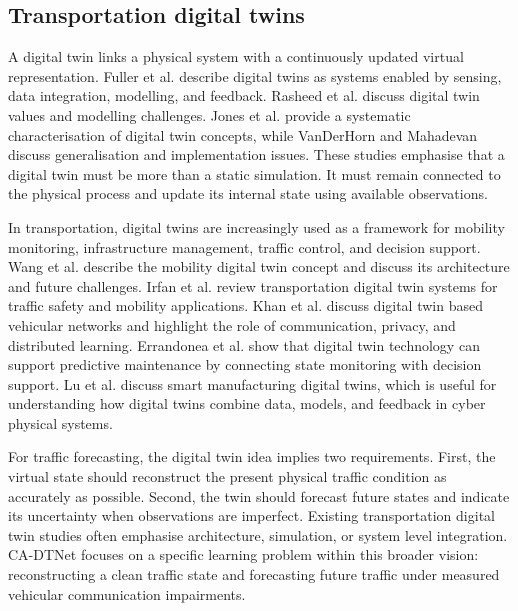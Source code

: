 \documentclass[pdflatex,sn-mathphys-num]{sn-jnl}%
\theoremstyle{thmstyleone}%
\theoremstyle{thmstyletwo}%
\theoremstyle{thmstylethree}%
\begin{document}
\subsection{Transportation digital twins}

A digital twin links a physical system with a continuously updated virtual representation. Fuller et al. \cite{fuller2020digitaltwin} describe digital twins as systems enabled by sensing, data integration, modelling, and feedback. Rasheed et al. \cite{rasheed2020digitaltwin} discuss digital twin values and modelling challenges. Jones et al. \cite{jones2020characterising} provide a systematic characterisation of digital twin concepts, while VanDerHorn and Mahadevan \cite{vanderhorn2021digitaltwin} discuss generalisation and implementation issues. These studies emphasise that a digital twin must be more than a static simulation. It must remain connected to the physical process and update its internal state using available observations.

In transportation, digital twins are increasingly used as a framework for mobility monitoring, infrastructure management, traffic control, and decision support. Wang et al. \cite{wang2022mobilitydt} describe the mobility digital twin concept and discuss its architecture and future challenges. Irfan et al. \cite{irfan2023transportationdt} review transportation digital twin systems for traffic safety and mobility applications. Khan et al. \cite{khan2023federateddt} discuss digital twin based vehicular networks and highlight the role of communication, privacy, and distributed learning. Errandonea et al. \cite{errandonea2020maintenance} show that digital twin technology can support predictive maintenance by connecting state monitoring with decision support. Lu et al. \cite{lu2020digitaltwin} discuss smart manufacturing digital twins, which is useful for understanding how digital twins combine data, models, and feedback in cyber physical systems.

For traffic forecasting, the digital twin idea implies two requirements. First, the virtual state should reconstruct the present physical traffic condition as accurately as possible. Second, the twin should forecast future states and indicate its uncertainty when observations are imperfect. Existing transportation digital twin studies often emphasise architecture, simulation, or system level integration. CA-DTNet focuses on a specific learning problem within this broader vision: reconstructing a clean traffic state and forecasting future traffic under measured vehicular communication impairments.
\end{document}

